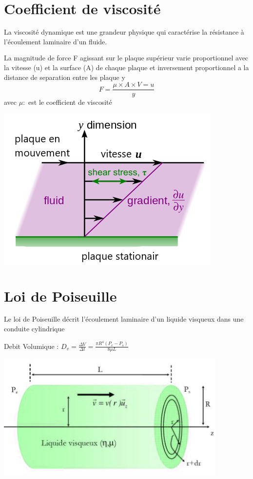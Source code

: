 \documentclass[12pt,oneside]{book}
\begin{document}
\section{Coefficient de viscosité}
La viscosité dynamique est une grandeur physique qui caractérise la résistance à l'écoulement laminaire d'un fluide.\\
\begin{minipage}{0.7\linewidth}
	La magnitude de force F agissant sur le plaque supérieur varie proportionnel avec la vitesse (u) et la surface (A) de chaque plaque et inversement proportionnel a la distance de separation entre les plaque y \\
	\[F = \frac{\mu\times A \times V=u}{y}\] 
	avec $ \mu : $ est le coefficient de viscosité
\end{minipage}
\begin{minipage}{0.3\linewidth}
	\includegraphics[width=\linewidth]{../pic/1103/6.png}
\end{minipage}
\section{Loi de Poiseuille}
Le loi de Poiseuille décrit l’écoulement laminaire d'un liquide visqueux dans une conduite cylindrique
\begin{minipage}{0.5\linewidth}
	Debit Volumique : $ D_v = \frac{\Delta V}{\Delta t} = \frac{\pi R^4 (P_e - P_s)}{8\mu L} $
\end{minipage}
\begin{minipage}{0.5\linewidth}
	\includegraphics[width=\linewidth]{../pic/1103/7.png}
\end{minipage}
\end{document}

